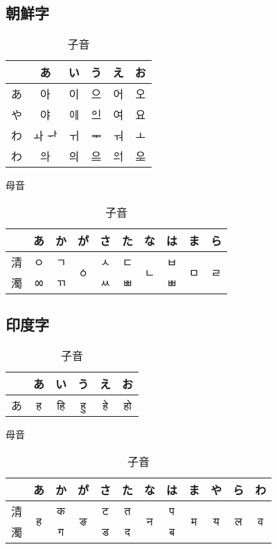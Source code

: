 \documentclass[]{jlreq}
\begin{document}
\subsection{朝鮮字}
\begin{table}[h]
  \begin{minipage}{.5\linewidth}\centering
    \begin{tabular}{r|ccccc}
         & あ    & い & う & え & お \\
      \hline
      あ & 아    & 이 & 으 & 어 & 오 \\
      や & 야    & ᄋퟄ & ᄋᆜ & 여 & 요 \\
      わ & ㅘ ᆉ & ㅟ & ᆍ & ㅝ & ㅗ \\
      わ & ᄋힹ    & 의 & ᄋᆖ & ᄋힺ & ᄋힼ
    \end{tabular}
    \caption{母音}
  \end{minipage}%
  \begin{minipage}{.5\linewidth}\centering
    \begin{tabular}{r|ccccccccc}
         & あ & か & か゚                  & さ & た & な                  & は & ま                  & ら                  \\
      \hline
      清 & ㅇ & ㄱ & \multirow{2}{*}{ㆁ} & ㅅ & ㄷ & \multirow{2}{*}{ㄴ} & ㅂ & \multirow{2}{*}{ㅁ} & \multirow{2}{*}{ㄹ} \\
      濁 & ㆀ & ㄲ &                     & ㅆ & ㅃ &                     & ㅃ &                     &
    \end{tabular}
    \caption{子音}
  \end{minipage}
\end{table}

\subsection{印度字}
\begin{table}[h]
  \begin{minipage}{.5\linewidth}\centering
    \begin{tabular}{r|ccccc}
         & あ & い & う & え & お \\
      \hline
      あ & ह  & हि & हु  & हे  & हो \\
    \end{tabular}
    \caption{母音}
  \end{minipage}%
  \begin{minipage}{.5\linewidth}\centering
    \begin{tabular}{r|ccccccccccc}
         & あ                 & か & か゚                 & さ & た & な                 & は & ま                 & や                 & ら                 & わ                 \\
      \hline
      清 & \multirow{2}{*}{ह} & क  & \multirow{2}{*}{ङ} & ट  & त  & \multirow{2}{*}{न} & प  & \multirow{2}{*}{म} & \multirow{2}{*}{य} & \multirow{2}{*}{ल} & \multirow{2}{*}{व} \\
      濁 &                    & ग  &                    & ड  & द  &                    & ब  &                    &
    \end{tabular}
    \caption{子音}
  \end{minipage}
\end{table}
\end{document}
